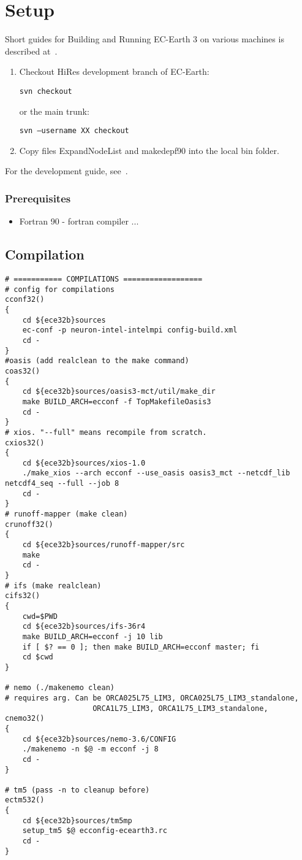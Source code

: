
\chapter{Setup}
Short guides for Building and Running EC-Earth 3 on various machines is described at~\cite{br-wiki}.

\begin{enumerate}
    \item Checkout HiRes development branch of EC-Earth: 
    
    \texttt{svn checkout }
    
    or the main trunk:
    
    \texttt{svn --username XX checkout }
    
    \item Copy files ExpandNodeList and makedepf90 into the local bin folder.
\end{enumerate}
For the development guide, see~\cite{dev-guide}.

\subsection*{Prerequisites}
\begin{itemize}
    \item Fortran 90 - fortran compiler
    ...
\end{itemize}


\section{Compilation}
\begin{lstlisting}
# =========== COMPILATIONS ==================
# config for compilations
cconf32()
{
    cd ${ece32b}sources
    ec-conf -p neuron-intel-intelmpi config-build.xml
    cd -
}
#oasis (add realclean to the make command)
coas32()
{
    cd ${ece32b}sources/oasis3-mct/util/make_dir
    make BUILD_ARCH=ecconf -f TopMakefileOasis3
    cd -
}
# xios. "--full" means recompile from scratch.
cxios32()
{
    cd ${ece32b}sources/xios-1.0
    ./make_xios --arch ecconf --use_oasis oasis3_mct --netcdf_lib netcdf4_seq --full --job 8
    cd -
}
# runoff-mapper (make clean)
crunoff32()
{
    cd ${ece32b}sources/runoff-mapper/src
    make
    cd -
}
# ifs (make realclean)
cifs32()
{
    cwd=$PWD 
    cd ${ece32b}sources/ifs-36r4
    make BUILD_ARCH=ecconf -j 10 lib
    if [ $? == 0 ]; then make BUILD_ARCH=ecconf master; fi
    cd $cwd
}

# nemo (./makenemo clean)
# requires arg. Can be ORCA025L75_LIM3, ORCA025L75_LIM3_standalone, 
                    ORCA1L75_LIM3, ORCA1L75_LIM3_standalone,
cnemo32()
{
    cd ${ece32b}sources/nemo-3.6/CONFIG
    ./makenemo -n $@ -m ecconf -j 8
    cd -
} 

# tm5 (pass -n to cleanup before)
ectm532()
{
    cd ${ece32b}sources/tm5mp
    setup_tm5 $@ ecconfig-ecearth3.rc
    cd -
}
\end{lstlisting}

